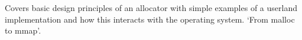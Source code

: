 Covers basic design principles of an allocator with simple examples of a
userland implementation and how this interacts with the operating system. `From
malloc to mmap'.\\
